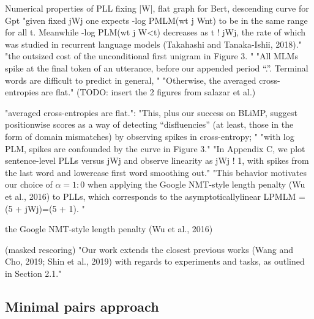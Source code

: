 Numerical properties of PLL
fixing |W|, flat graph for Bert, descending curve for Gpt  
"given fixed jWj one expects -log PMLM(wt j Wnt) to be in the same range for
all t. Meanwhile -log PLM(wt j W<t) decreases as t ! jWj, the rate of which was studied in recurrent language models (Takahashi and Tanaka-Ishii, 2018)." \citet{salazar2020masked}
"the outsized cost of the unconditional first unigram in Figure 3. "
"All MLMs spike at the final token of an utterance, before our appended period “.”. Terminal words are difficult to predict in general, " "Otherwise, the averaged cross-entropies are flat." \citet{salazar2020masked}
(TODO: insert the 2 figures from salazar et al.)

"averaged cross-entropies are flat.": "This, plus our success on BLiMP, suggest positionwise scores as a way of detecting “disfluencies” (at least, those in the form of domain mismatches) by observing spikes in cross-entropy; "  \citet{salazar2020masked}
"with log PLM, spikes are confounded by the curve in Figure 3."  \citet{salazar2020masked}
"In Appendix C, we plot sentence-level PLLs versus jWj and observe linearity as jWj ! 1, with spikes from the last word and lowercase first word smoothing out." "This behavior motivates our choice of $\alpha = 1:0$ when applying the Google NMT-style length penalty (Wu et al., 2016)  to PLLs, which corresponds to the asymptoticallylinear LPMLM = (5 + jWj)=(5 + 1). " \citet{salazar2020masked}

the Google NMT-style length penalty (Wu et al., 2016)   \citet{salazar2020masked}

(masked rescoring)
"Our work extends the closest previous works (Wang and Cho, 2019; Shin et al., 2019) with regards to experiments and tasks, as outlined in Section 2.1." \citet{salazar2020masked}

\subsection{Minimal pairs approach}


